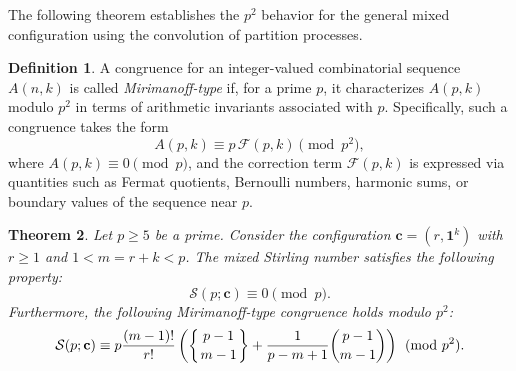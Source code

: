 \documentclass[12pt]{amsart}
\newtheorem{theorem}{Theorem}[section]
\theoremstyle{definition}
\newtheorem{definition}[theorem]{Definition}
\begin{document}
The following theorem establishes the $p^2$ behavior for the general mixed configuration using the convolution of partition processes.
\begin{definition}
A congruence for an integer-valued combinatorial sequence $A(n,k)$ is called \emph{Mirimanoff-type} if, for a prime $p$, it characterizes $A(p,k)$ modulo $p^2$ in terms of arithmetic invariants associated with $p$. Specifically, such a congruence takes the form
\[
A(p,k) \equiv p\,\mathcal{F}(p,k) \pmod{p^2},
\]
where $A(p,k) \equiv 0 \pmod p$, and the correction term $\mathcal{F}(p,k)$ is expressed via quantities such as Fermat quotients, Bernoulli numbers, harmonic sums, or boundary values of the sequence near $p$.
\end{definition}
\begin{theorem}
\label{thm:mixed_stirling_p2}
Let $p \geq 5$ be a prime. Consider the configuration $\mathbf{c} = (r, \mathbf{1}^k)$ with $r \geq 1$ and $1 < m = r+k < p$. The mixed Stirling number satisfies the following property:
\begin{equation}
    \mathcal{S}(p; \mathbf{c}) \equiv 0 \pmod p.
\end{equation}
Furthermore, the following Mirimanoff-type congruence holds modulo $p^2$:
\begin{equation}
    \mathcal{S}(p; \mathbf{c}) \equiv p \frac{(m-1)!}{r!} \left( \left\{ \genfrac{}{}{0pt}{}{p-1}{m-1} \right\} + \frac{1}{p-m+1} \binom{p-1}{m-1} \right) \pmod{p^2}.
\end{equation}
\end{theorem}
\end{document}

